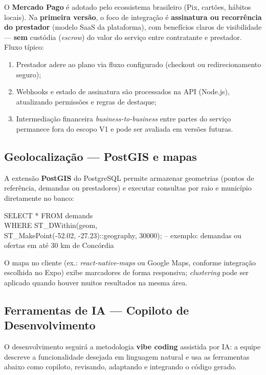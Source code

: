 \documentclass[12pt, a4paper]{article}
\begin{document}
O \textbf{Mercado Pago} \cite{mercadopago2024} é adotado pelo ecossistema
brasileiro (Pix, cartões, hábitos locais). Na \textbf{primeira versão},
o foco de integração é \textbf{assinatura ou recorrência do prestador}
(modelo SaaS da plataforma), com benefícios claros de visibilidade ---
\textbf{sem} custódia (\textit{escrow}) do valor do serviço entre
contratante e prestador. Fluxo típico:

\begin{enumerate}
  \item Prestador adere ao plano via fluxo configurado (checkout ou
        redirecionamento seguro);
  \item Webhooks e estado de assinatura são processados na API (Node.js),
        atualizando permissões e regras de destaque;
  \item Intermediação financeira \textit{business-to-business} entre
        partes do serviço permanece fora do escopo V1 e pode ser
        avaliada em versões futuras.
\end{enumerate}

\subsection{Geolocalização --- PostGIS e mapas}

A extensão \textbf{PostGIS} do PostgreSQL permite armazenar geometrias
(pontos de referência, demandas ou prestadores) e executar consultas por
raio e município diretamente no banco:

\begin{notebox}
\small\ttfamily
SELECT * FROM demands \\
WHERE ST\_DWithin(geom, \\
\quad ST\_MakePoint(-52.02, -27.23)::geography, 30000);
-- exemplo: demandas ou ofertas em até 30 km de Concórdia
\end{notebox}

O mapa no cliente (ex.: \textit{react-native-maps} ou Google Maps,
conforme integração escolhida no Expo) exibe marcadores de forma
responsiva; \textit{clustering} pode ser aplicado quando houver muitos
resultados na mesma área.

\subsection{Ferramentas de IA --- Copiloto de Desenvolvimento}

O desenvolvimento seguirá a metodologia \textbf{vibe coding} assistida
por IA: a equipe descreve a funcionalidade desejada em linguagem natural
e usa as ferramentas abaixo como copiloto, revisando, adaptando e
integrando o código gerado.
\end{document}
